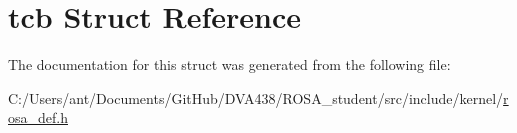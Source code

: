 \hypertarget{structtcb}{}\section{tcb Struct Reference}
\label{structtcb}


The documentation for this struct was generated from the following file\+:\begin{DoxyCompactItemize}
\item 
C\+:/\+Users/ant/\+Documents/\+Git\+Hub/\+D\+V\+A438/\+R\+O\+S\+A\+\_\+student/src/include/kernel/\mbox{\hyperlink{rosa__def_8h}{rosa\+\_\+def.\+h}}\end{DoxyCompactItemize}
